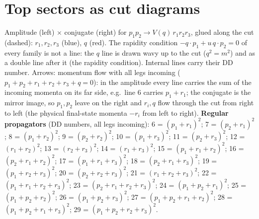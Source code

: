 \documentclass[10pt]{article}
\begin{document}
\section*{Top sectors as cut diagrams}
Amplitude (left) $\times$ conjugate (right) for $p_1 p_2 \to V(q)\, r_1 r_2 r_3$, glued along the cut (dashed): $r_1, r_2, r_3$ (blue), $q$ (red). The rapidity condition $-q\cdot p_1 + u\, q\cdot p_2 = 0$ of every family is not a line: the $q$ line is drawn wavy up to the cut ($q^2 = m^2$) and as a double line after it (the rapidity condition). Internal lines carry their DD number. Arrows: momentum flow with all legs incoming ($p_1+p_2+r_1+r_2+r_3+q=0$): in the amplitude every line carries the sum of the incoming momenta on its far side, e.g.\ line 6 carries $p_1+r_1$; the conjugate is the mirror image, so $p_1, p_2$ leave on the right and $r_i, q$ flow through the cut from right to left (the physical final-state momenta $-r_i$ from left to right). \textbf{Regular propagators} (DD numbers, all legs incoming): 6 = $(p_1+r_1)^2$; 7 = $(p_2+r_1)^2$; 8 = $(p_1+r_2)^2$; 9 = $(p_2+r_2)^2$; 10 = $(p_1+r_3)^2$; 11 = $(p_2+r_3)^2$; 12 = $(r_1+r_2)^2$; 13 = $(r_2+r_3)^2$; 14 = $(r_1+r_3)^2$; 15 = $(p_1+r_1+r_2)^2$; 16 = $(p_2+r_1+r_2)^2$; 17 = $(p_1+r_1+r_3)^2$; 18 = $(p_2+r_1+r_3)^2$; 19 = $(p_1+r_2+r_3)^2$; 20 = $(p_2+r_2+r_3)^2$; 21 = $(r_1+r_2+r_3)^2$; 22 = $(p_1+r_1+r_2+r_3)^2$; 23 = $(p_2+r_1+r_2+r_3)^2$; 24 = $(p_1+p_2+r_1)^2$; 25 = $(p_1+p_2+r_2)^2$; 26 = $(p_1+p_2+r_3)^2$; 27 = $(p_1+p_2+r_1+r_2)^2$; 28 = $(p_1+p_2+r_1+r_3)^2$; 29 = $(p_1+p_2+r_2+r_3)^2$.\par\medskip
\end{document}
